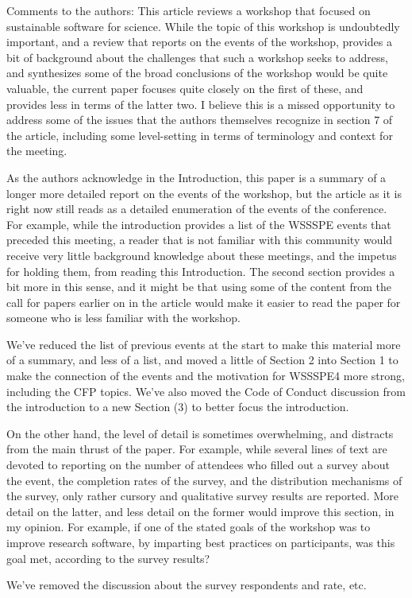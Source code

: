 \documentclass[11pt]{article}
\begin{document}
\begin{quoting}
Comments to the authors: 
This article reviews a workshop that focused on sustainable software for science. While the topic of this workshop is undoubtedly important, and a review that reports on the events of the workshop, provides a bit of background about the challenges that such a workshop seeks to address, and synthesizes some of the broad conclusions of the workshop would be quite valuable, the current paper focuses quite closely on the first of these, and provides less in terms of the latter two. I believe this is a missed opportunity to address some of the issues that the authors themselves recognize in section 7 of the article, including some level-setting in terms of terminology and context for the meeting.

As the authors acknowledge in the Introduction, this paper is a summary of a longer more detailed report on the events of the workshop, but the article as it is right now still reads as a detailed enumeration of the events of the conference. For example, while the introduction provides a list of the WSSSPE events that preceded this meeting, a reader that is not familiar with this community would receive very little background knowledge about these meetings, and the impetus for holding them, from reading this Introduction. The second section provides a bit more in this sense, and it might be that using some of the content from the call for papers earlier on in the article would make it easier to read the paper for someone who is less familiar with the workshop.

\end{quoting}
We've reduced the list of previous events at the start to make this material more of a summary, and less of a list, and moved a little of Section 2 into Section 1 to make the connection of the events and the motivation for WSSSPE4 more strong, including the CFP topics.  We've also moved the Code of Conduct discussion from the introduction to a new Section (3) to better focus the introduction.
\begin{quoting}


On the other hand, the level of detail is sometimes overwhelming, and distracts from the main thrust of the paper. For example, while several lines of text are devoted to reporting on the number of attendees who filled out a survey about the event, the completion rates of the survey, and the distribution mechanisms of the survey, only rather cursory and qualitative survey results are reported. More detail on the latter, and less detail on the former would improve this section, in my opinion.  For example, if one of the stated goals of the workshop was to improve research software, by imparting best practices on participants, was this goal met, according to the survey results? 

\end{quoting}
We've removed the discussion about the survey respondents and rate, etc.
\end{document}
